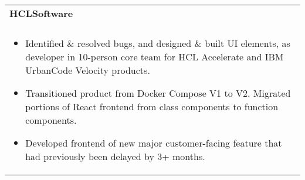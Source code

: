 \documentclass[letterpaper,10pt]{article} %
\begin{document}
\begin{tabular*}{\linewidth}{@{\extracolsep{\fill}} lr }
\textbf{HCLSoftware} & \scriptsize\bfseries\color{sectioncolour}{Remote}\\
\footnotesize\bfseries\color{sectioncolour}{Software Engineer Intern} & \scriptsize\bfseries\color{sectioncolour}{May 2023 - August 2023}\\
\multicolumn{2}{p{\linewidth}}{
    \scriptsize{\vspace{-0.1in}\begin{itemize}
        \item Identified \& resolved bugs, and designed \& built UI elements, as developer in 10-person core team for HCL Accelerate and IBM UrbanCode Velocity products.
        \item Transitioned product from Docker Compose V1 to V2. Migrated portions of React frontend from class components to function components.
        \item Developed frontend of new major customer-facing feature that had previously been delayed by 3+ months.
    \end{itemize}\vspace{-0.0in}}
}\\


\end{tabular*}
\end{document}
